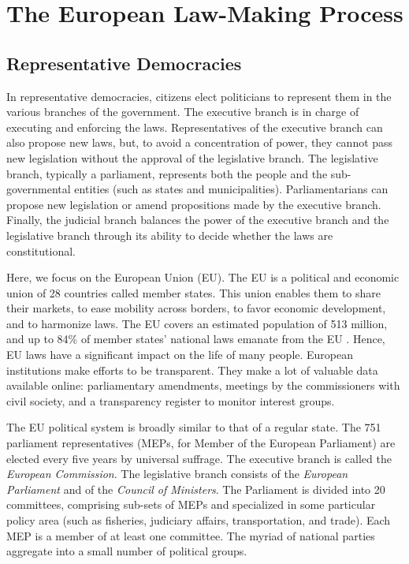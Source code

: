 \section{The European Law-Making Process}
\label{sec:background}

\subsection{Representative Democracies}

In representative democracies, citizens elect politicians to represent them in the various branches of the government.
The executive branch is in charge of executing and enforcing the laws.
Representatives of the executive branch can also propose new laws, but, to avoid a concentration of power, they cannot pass new legislation without the approval of the legislative branch.
The legislative branch, typically a parliament, represents both the people and the sub-governmental entities (such as states and municipalities).
Parliamentarians  can propose new legislation or amend propositions made by the executive branch.
Finally, the judicial branch balances the power of the executive branch and the legislative branch through its ability to decide whether the laws are constitutional.

Here, we focus on the European Union (EU).
The EU is a political and economic union of 28 countries called member states.
This union enables them to share their markets, to ease mobility across borders, to favor economic development, and to harmonize laws.
The EU covers an estimated population of 513 million, and up to 84\% of member states' national laws emanate from the EU \cite{miller2010much}.
Hence, EU laws have a significant impact on the life of many people.
European institutions make efforts to be transparent.
They make a lot of valuable data available online: parliamentary amendments, meetings by the commissioners with civil society, and a transparency register to monitor interest groups.

The EU political system is broadly similar to that of a regular state.
The 751 parliament representatives (MEPs, for Member of the European Parliament) are elected every five years by universal suffrage.
The executive branch is called the \textit{European Commission}.
The legislative branch consists of the \textit{European Parliament} and of the \textit{Council of Ministers}.
The Parliament is divided into 20 committees, comprising sub-sets of MEPs and specialized in some particular policy area (such as fisheries, judiciary affairs, transportation, and trade).
Each MEP is a member of at least one committee.
The myriad of national parties aggregate into a small number of political groups.

